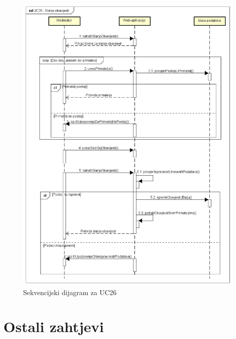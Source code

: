 \eject

\begin{figure}[H]
	\includegraphics[scale=0.6]{slike/SekvencijskiDijagramUC26.jpg}
	\centering
	\caption{Sekvencijski dijagram za UC26}
	\label{fig:sekvencijski_dijagram_uc26}
\end{figure}

\eject

\section{Ostali zahtjevi}

